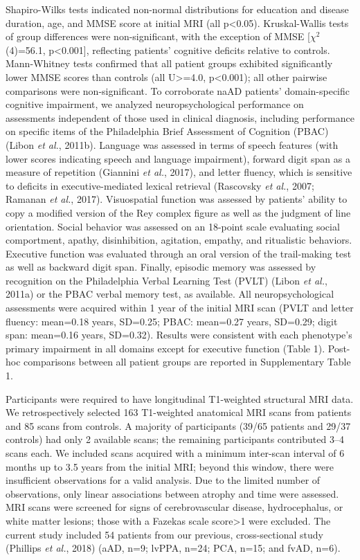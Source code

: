 \documentclass[]{article}
\begin{document}
Shapiro-Wilks tests indicated non-normal distributions for education and
disease duration, age, and MMSE score at initial MRI (all
p\textless{}0.05). Kruskal-Wallis tests of group differences were
non-significant, with the exception of MMSE {[}\(\chi^2\)(4)=56.1,
p\textless{}0.001{]}, reflecting patients' cognitive deficits relative
to controls. Mann-Whitney tests confirmed that all patient groups
exhibited significantly lower MMSE scores than controls (all
U\textgreater{}=4.0, p\textless{}0.001); all other pairwise comparisons
were non-significant. To corroborate naAD patients' domain-specific
cognitive impairment, we analyzed neuropsychological performance on
assessments independent of those used in clinical diagnosis, including
performance on specific items of the Philadelphia Brief Assessment of
Cognition (PBAC) (Libon \emph{et al.}, 2011b). Language was assessed in
terms of speech features (with lower scores indicating speech and
language impairment), forward digit span as a measure of repetition
(Giannini \emph{et al.}, 2017), and letter fluency, which is sensitive
to deficits in executive-mediated lexical retrieval (Rascovsky \emph{et
al.}, 2007; Ramanan \emph{et al.}, 2017). Visuospatial function was
assessed by patients' ability to copy a modified version of the Rey
complex figure as well as the judgment of line orientation. Social
behavior was assessed on an 18-point scale evaluating social
comportment, apathy, disinhibition, agitation, empathy, and ritualistic
behaviors. Executive function was evaluated through an oral version of
the trail-making test as well as backward digit span. Finally, episodic
memory was assessed by recognition on the Philadelphia Verbal Learning
Test (PVLT) (Libon \emph{et al.}, 2011a) or the PBAC verbal memory test,
as available. All neuropsychological assessments were acquired within 1
year of the initial MRI scan (PVLT and letter fluency: mean=0.18 years,
SD=0.25; PBAC: mean=0.27 years, SD=0.29; digit span: mean=0.16 years,
SD=0.32). Results were consistent with each phenotype's primary
impairment in all domains except for executive function (Table 1).
Post-hoc comparisons between all patient groups are reported in
Supplementary Table 1.

Participants were required to have longitudinal T1-weighted structural
MRI data. We retrospectively selected 163 T1-weighted anatomical MRI
scans from patients and 85 scans from controls. A majority of
participants (39/65 patients and 29/37 controls) had only 2 available
scans; the remaining participants contributed 3--4 scans each. We
included scans acquired with a minimum inter-scan interval of 6 months
up to 3.5 years from the initial MRI; beyond this window, there were
insufficient observations for a valid analysis. Due to the limited
number of observations, only linear associations between atrophy and
time were assessed. MRI scans were screened for signs of cerebrovascular
disease, hydrocephalus, or white matter lesions; those with a Fazekas
scale score\textgreater{}1 were excluded. The current study included 54
patients from our previous, cross-sectional study (Phillips \emph{et
al.}, 2018) (aAD, n=9; lvPPA, n=24; PCA, n=15; and fvAD, n=6).
\end{document}
